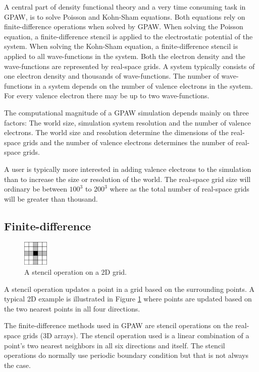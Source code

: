 \documentclass[preprint,3p,times,twocolumn]{elsarticle}
\begin{document}
A central part of density functional theory and a very time consuming task in GPAW, is to solve Poisson and Kohn-Sham equations. Both equations rely on finite-difference operations when solved by GPAW. When solving the Poisson equation, a finite-difference stencil is applied to the electrostatic potential of the system. When solving the Kohn-Sham equation, a finite-difference stencil is applied to all wave-functions in the system. Both the electron density and the wave-functions are represented by real-space grids. A system typically consists of one electron density and thousands of wave-functions. The number of wave-functions in a system depends on the number of valence electrons in the system. For every valence electron there may be up to two wave-functions.

The computational magnitude of a GPAW simulation depends mainly on three factors: The world size, simulation system resolution and the number of valence electrons. The world size and resolution determine the dimensions of the real-space grids and the number of valence electrons determines the number of real-space grids.

A user is typically more interested in adding valence electrons to the simulation than to increase the size or resolution of the world. The real-space grid size will ordinary be between $100^3$ to $200^3$ where as the total number of real-space grids will be greater than thousand.

\subsection{Finite-difference}
\begin{figure}
 \centering
 \includegraphics[width=45px]{gfx/stencil}
 \caption{A stencil operation on a 2D grid.}
 \label{fig:stencil}
\end{figure}
A stencil operation updates a point in a grid based on the surrounding points. A typical 2D example is illustrated in Figure \ref{fig:stencil} where points are updated based on the two nearest points in all four directions.

The finite-difference methods used in GPAW are stencil operations on the real-space grids (3D arrays). The stencil operation used is a linear combination of a point's two nearest neighbors in all six directions and itself. 
The stencil operations do normally use periodic boundary condition but that is not always the case.
\end{document}
